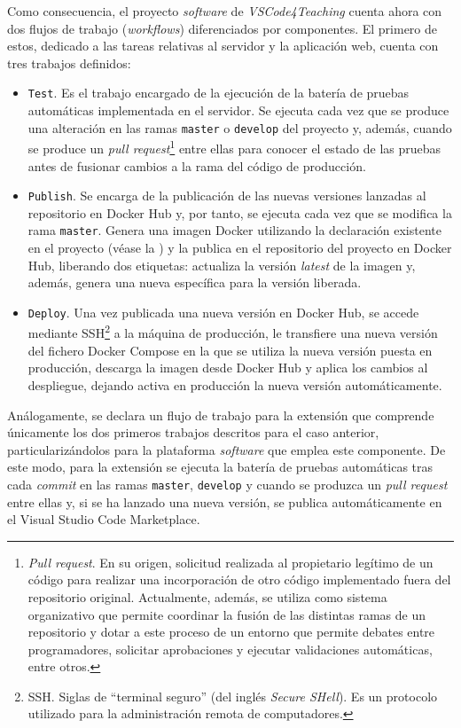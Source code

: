 Como consecuencia, el proyecto \textit{software} de \textit{VSCode4Teaching} cuenta ahora con dos flujos de trabajo (\textit{workflows}) diferenciados por componentes. El primero de estos, dedicado a las tareas relativas al servidor y la aplicación web, cuenta con tres trabajos definidos:
\begin{itemize}
    \item \texttt{Test}. Es el trabajo encargado de la ejecución de la batería de pruebas automáticas implementada en el servidor. Se ejecuta cada vez que se produce una alteración en las ramas \texttt{master} o \texttt{develop} del proyecto y, además, cuando se produce un \textit{pull request}\footnote{\textit{Pull request}. En su origen, solicitud realizada al propietario legítimo de un código para realizar una incorporación de otro código implementado fuera del repositorio original. Actualmente, además, se utiliza como sistema organizativo que permite coordinar la fusión de las distintas ramas de un repositorio y dotar a este proceso de un entorno que permite debates entre programadores, solicitar aprobaciones y ejecutar validaciones automáticas, entre otros.} entre ellas para conocer el estado de las pruebas antes de fusionar cambios a la rama del código de producción.
    \item \texttt{Publish}. Se encarga de la publicación de las nuevas versiones lanzadas al repositorio en Docker Hub y, por tanto, se ejecuta cada vez que se modifica la rama \texttt{master}. Genera una imagen Docker utilizando la declaración existente en el proyecto (véase la ) y la publica en el repositorio del proyecto en Docker Hub, liberando dos etiquetas: actualiza la versión \textit{latest} de la imagen y, además, genera una nueva específica para la versión liberada.
    \item \texttt{Deploy}. Una vez publicada una nueva versión en Docker Hub, se accede mediante SSH\footnote{SSH. Siglas de ``terminal seguro'' (del inglés \textit{Secure SHell}). Es un protocolo utilizado para la administración remota de computadores.} a la máquina de producción, le transfiere una nueva versión del fichero Docker Compose en la que se utiliza la nueva versión puesta en producción, descarga la imagen desde Docker Hub y aplica los cambios al despliegue, dejando activa en producción la nueva versión automáticamente.
\end{itemize}

Análogamente, se declara un flujo de trabajo para la extensión que comprende únicamente los dos primeros trabajos descritos para el caso anterior, particularizándolos para la plataforma \textit{software} que emplea este componente. De este modo, para la extensión se ejecuta la batería de pruebas automáticas tras cada \textit{commit} en las ramas \texttt{master}, \texttt{develop} y cuando se produzca un \textit{pull request} entre ellas y, si se ha lanzado una nueva versión, se publica automáticamente en el Visual Studio Code Marketplace.

